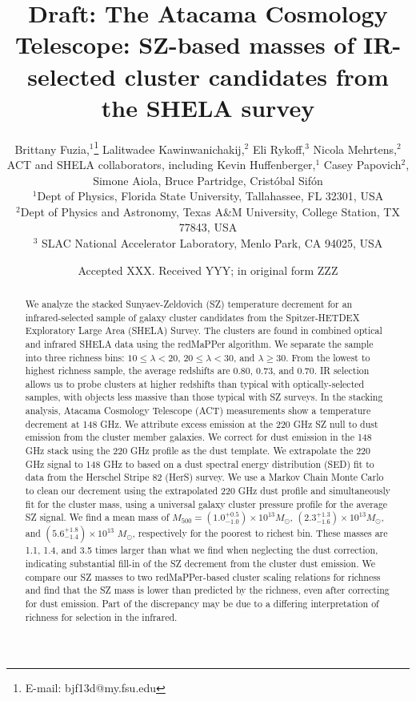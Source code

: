 \documentclass[a4paper,fleqn,usenatbib]{mnras}
\title[SZ effect in SHELA cluster candidates]{Draft: The Atacama Cosmology Telescope: SZ-based masses of IR-selected cluster candidates from the SHELA survey}
\author[B. Fuzia et al.]{
Brittany Fuzia,$^{1}$\thanks{E-mail: bjf13d@my.fsu.edu}
Lalitwadee Kawinwanichakij,$^{2}$
Eli Rykoff,$^{3}$
Nicola Mehrtens,$^{2}$
\newauthor ACT and SHELA collaborators, 
including
Kevin Huffenberger,$^1$ 
Casey Papovich$^{2}$, 
\newauthor Simone Aiola, Bruce Partridge, Crist\'obal Sif\'on
\\
$^{1}$Dept of Physics, Florida State University, Tallahassee, FL 32301, USA\\
$^{2}$Dept of Physics and Astronomy, Texas A\&M University, College Station, TX 77843, USA\\
$^{3}$ SLAC National Accelerator Laboratory, Menlo Park, CA 94025, USA\\
}
\date{Accepted XXX. Received YYY; in original form ZZZ}
\begin{document}
\label{firstpage}
\pagerange{\pageref{firstpage}--\pageref{lastpage}}
\maketitle

\begin{abstract}
We analyze the stacked Sunyaev-Zeldovich (SZ) temperature decrement for an infrared-selected sample of galaxy cluster candidates from the Spitzer-HETDEX Exploratory Large Area (SHELA) Survey. The clusters are found in combined optical and infrared SHELA data using the redMaPPer algorithm. We separate the sample into three richness bins: $10 \leq \lambda < 20$, $20 \leq \lambda < 30$, and $\lambda \geq 30$. From the lowest to highest richness sample, the average redshifts are 0.80, 0.73, and 0.70. IR selection allows us to probe clusters at higher redshifts than typical with optically-selected samples, with objects less massive than those typical with SZ surveys. In the stacking analysis, Atacama Cosmology Telescope (ACT) measurements show a temperature decrement at 148 GHz. We attribute excess emission at the 220 GHz SZ null to dust emission from the cluster member galaxies. We correct for dust emission in the 148 GHz stack using the 220 GHz profile as the dust template. We extrapolate the 220 GHz signal to 148 GHz to based on a dust spectral energy distribution (SED) fit to data from the Herschel Stripe 82 (HerS) survey.  We use a Markov Chain Monte Carlo to clean our decrement using the extrapolated 220 GHz dust profile and simultaneously fit for the cluster mass, using a universal galaxy cluster pressure profile for the average SZ signal.  We find a mean mass of $M_{500} = (1.0^{+0.5}_{-1.0})\times 10^{13} M_{\odot}$, $(2.3^{+1.3}_{-1.6})\times 10^{13} M_{\odot}$, and $(5.6^{+1.8}_{-1.4}) \times 10^{13}$ $M_{\odot}$, respectively for the poorest to richest bin. These masses are 1.1, 1.4, and 3.5 times larger than what we find when neglecting the dust correction, indicating substantial fill-in of the SZ decrement from the cluster dust emission. We compare our SZ masses to two redMaPPer-based cluster scaling relations for richness and find that the SZ mass is lower than predicted by the richness, even after correcting for dust emission.  Part of the discrepancy may be due to a differing interpretation of richness for selection in the infrared.
\end{abstract}
\end{document}
